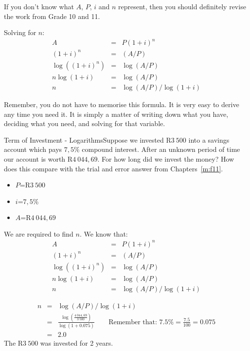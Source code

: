If you don't know what $A$, $P$, $i$ and $n$ represent, then you should definitely revise the work from Grade 10 and 11.

Solving for $n$:
\begin{eqnarray*}
A &=& P(1+i)^n\\
(1+i)^n &=& (A/P)\\
\log((1+i)^n)&=&\log(A/P)\\
n\log(1+i)&=&\log(A/P)\\
n &=& \log(A/P) / \log(1+i)
\end{eqnarray*}

Remember, you do not have to memorise this formula. It is very easy to derive any time you need it. It is simply a matter of writing down what you have, deciding what you need, and solving for that variable.

\begin{wex}{Term of Investment - Logarithms}{Suppose we invested R$3~500$ into a savings account which pays $7,5\%$ compound interest. After an unknown period of time our account is worth R$4~044,69$. For how long did we invest the money? How does this compare with the trial and error answer from Chapters~\ref{m:f11}.}{
\begin{itemize}
\item{$P$=R$3~500$}
\item{$i$=$7,5$\%}
\item{$A$=R$4~044,69$}
\end{itemize}
We are required to find $n$.
We know that:
\begin{eqnarray*}
A &=& P(1+i)^n\\
(1+i)^n &=& (A/P)\\
\log((1+i)^n)&=&\log(A/P)\\
n\log(1+i)&=&\log(A/P)\\
n &=& \log(A/P) / \log(1+i)
\end{eqnarray*}

\begin{eqnarray*}
n &=& \log(A/P) / \log(1+i)\\
&=&\frac{\log(\frac{4~044,69}{3~500})}{\log(1+0.075)}\qquad \mbox{Remember that: }7.5\%=\frac{7.5}{100}=0.075\\
&=&2.0
\end{eqnarray*}
The R$3~500$ was invested for 2 years.}
\end{wex}

